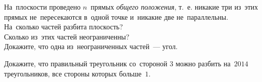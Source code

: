 \begin{problems}
\item
На~плоскости проведено $n$~прямых \emph{общего положения}, т.~е. никакие три из~этих
прямых не~пересекаются в~одной точке и~никакие две не~параллельны.
\\
\sbp
На~сколько частей разбита плоскость?
\\
\sbp
Сколько из~этих частей неограниченны?
\\
\sbp
Докажите, что одна из~неограниченных частей~--- угол.

\item
Докажите, что правильный треугольник со~стороной $3$ можно разбить на~$2014$
треугольников, все стороны которых больше~$1$.

\end{problems}

